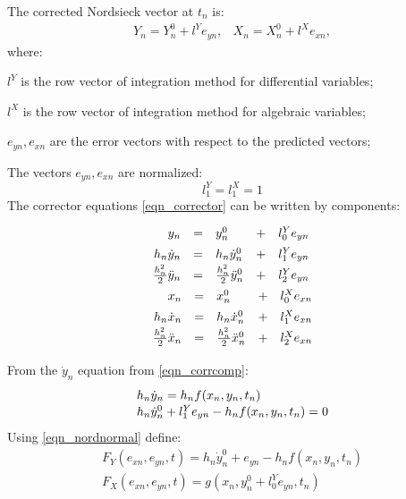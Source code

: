 \documentclass[lettersize,journal]{IEEEtran}
\begin{document}
The corrected Nordsieck vector at \(t_n\) is: 
\begin{equation}
	\label{eqn_corrector}
	\begin{array}{cc}
		Y_n=Y_n^0 +l^Ye_{yn}, &
		X_n=X_n^0 +l^Xe_{xn},
	\end{array}
\end{equation}
\noindent where:
\begin{description}
	\item  \(l^Y\) is the row vector of integration method for differential variables;
	\item  \(l^X\) is the row vector of integration method for algebraic variables;
	\item  \(e_{yn}, e_{xn}\) are the error vectors with respect to the predicted vectors;
\end{description}
The vectors \(e_{yn}, e_{xn}\) are normalized:
\begin{equation}
	\label{eqn_nordnormal}
		l^Y_1=l^X_1=1
\end{equation}
The corrector equations \eqref{eqn_corrector} can be written by components:
\begin{equation}
	\label{eqn_corrcomp}
	\def\arraystretch{1.4}
	\begin{array}{l}
		\begin{array}{rllll}
			y_n &= &y_n^0&+&l_0^Ye_{yn} \\
			h_n \dot{y}_n &=& h_n \dot{y}_n^0&+&l_1^Ye_{yn} \\
			\frac{h_n^2}{2}\ddot{y}_n &=& \frac{h_n^2}{2}\ddot{y}_n^0& + &l_2^Ye_{yn}
		\end{array}
		\\
		\begin{array}{rllll}
			x_n &= &x_n^0&+&l_0^Xe_{xn} \\
			h_n \dot{x}_n &=& h_n \dot{x}_n^0&+&l_1^Xe_{xn} \\
			\frac{h_n^2}{2}\ddot{x}_n &=& \frac{h_n^2}{2}\ddot{x}_n^0& + &l_2^Xe_{xn}
		\end{array}
	\end{array}
\end{equation}

From the \(\dot{y}_n\) equation from \eqref{eqn_corrcomp}:
\begin{equation}
	\label{eqn_corrdiff}
	\def\arraystretch{1.1}
	\begin{array}{l}
		h_n\dot{y}_n =  h_nf(x_n,y_n,t_n)\\
		h_n\dot{y}_n^0+l_1^Ye_{yn} - h_nf(x_n,y_n,t_n) = 0
	\end{array}
\end{equation}
Using \eqref{eqn_nordnormal} define:
\begin{equation}
	\label{eqn_define}
	\begin{array}{c}
		F_Y(e_{xn}, e_{yn}, t) = h_n\dot{y}_n^0+e_{yn}-h_nf(x_n, y_n, t_n) \\
		F_X(e_{xn}, e_{yn}, t) = g(x_n, y_n^0+l_0^Ye_{yn}, t_n)
	\end{array}
\end{equation}
\end{document}
